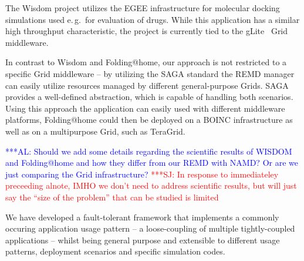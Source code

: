 \documentclass[times, 10pt, twocolumn]{article}
\newcommand{\kimnote}[1]{ {\textcolor{green} { ***JK: #1 }}}
\newcommand{\alnote}[1]{ {\textcolor{blue} { ***AL: #1 }}}
\newcommand{\jhanote}[1]{ {\textcolor{red} { ***SJ: #1 }}}
\newcommand{\kimnote}[1]{}
\newcommand{\alnote}[1]{}
\newcommand{\jhanote}[1]{}
\newcommand{\up}{\vspace*{-1em}}
\begin{document}
The Wisdom project utilizes the EGEE infrastructure for molecular
docking simulations used e.\,g.\ for evaluation of drugs. While this
application has a similar high throughput characteristic, the project
is currently tied to the gLite~\cite{glite2008} Grid middleware.


In contrast to Wisdom and Folding@home, our approach is not restricted
to a specific Grid middleware -- by utilizing the SAGA standard the
REMD manager can easily utilize resources managed by different
general-purpose Grids.  SAGA provides a well-defined abstraction,
which is capable of handling both scenarios. Using this approach the
application can easily used with different middleware platforms,
Folding@home could then be deployed on a BOINC infrastructure as well
as on a multipurpose Grid, such as TeraGrid.

\alnote{Should we add some details regarding the scientific results of
  WISDOM and Folding@home and how they differ from our REMD with NAMD?
  Or are we just comparing the Grid infrastructure?}  \jhanote{In
  response to immediateley preceeding alnote, IMHO we don't need to
  address scientific results, but will just say the ``size of the
  problem'' that can be studied is limited}

% 


\up
We have developed a fault-tolerant framework that implements a
commonly occuring application usage pattern -- a loose-coupling of
multiple tightly-coupled applications -- whilst being general purpose
and extensible to different usage patterns, deployment scenarios and
specific simulation codes.
\end{document}
